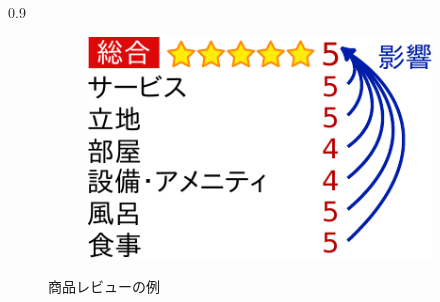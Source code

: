 \documentclass[unicode,10pt]{beamer}
\newlength{\mycolumnwidth}
\begin{document}
\begin{frame}[t]
\begin{columns}[onlytextwidth,t]
\begin{column}{0.9\mycolumnwidth}
\begin{figure}
\begin{subfigure}[t]{0.52\linewidth}
        \includegraphics[width=0.9\linewidth]
                        {fig/relations_among_rating_categories.pdf}
      \end{subfigure}
      \hspace*{\fill} %
      \caption*{商品レビューの例}
    \end{figure}
  \end{column}
\end{columns}


\end{frame}
\end{document}
